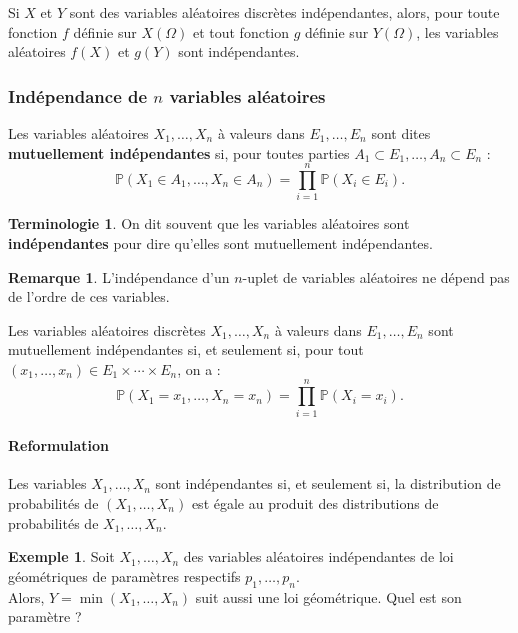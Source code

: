\documentclass[french]{article}
\renewcommand{\P}{\mathbb{P}}
\theoremstyle{plain}
\theoremstyle{definition}
\newtheorem*{ex}{Exemple}
\newtheorem*{rmq}{Remarque}
\newtheorem*{terminologie}{Terminologie}
\theoremstyle{remark}
\begin{document}
\begin{prop}%
	Si $X$ et $Y$ sont des variables aléatoires discrètes indépendantes, alors, pour toute fonction $f$ définie sur $X(\Omega)$ et tout fonction $g$ définie sur $Y(\Omega)$, les variables aléatoires $f(X)$ et $g(Y)$ sont indépendantes.
\end{prop}

\subsubsection*{Indépendance de $n$ variables aléatoires}

\begin{dfn}
	Les variables aléatoires $X_1,\ldots,X_n$ à valeurs dans $E_1,\ldots,E_n$ sont dites \textbf{mutuellement indépendantes} si, pour toutes parties $A_1\subset E_1,\ldots,A_n\subset E_n$ : $$\P(X_1\in A_1,\ldots,X_n\in A_n)=\prod_{i=1}^{n}\P(X_i\in E_i).$$
\end{dfn}

\begin{terminologie}
	On dit souvent que les variables aléatoires sont \textbf{indépendantes} pour dire qu'elles sont mutuellement indépendantes.
\end{terminologie}

\begin{rmq}
	L'indépendance d'un $n$-uplet de variables aléatoires ne dépend pas de l'ordre de ces variables.
\end{rmq}

\begin{prop}%
	Les variables aléatoires discrètes $X_1,\ldots,X_n$ à valeurs dans $E_1,\ldots,E_n$ sont mutuellement indépendantes si, et seulement si, pour tout $(x_1,\ldots,x_n)\in E_1\times\cdots\times E_n$, on a :
	$$\P(X_1=x_1,\ldots,X_n=x_n)=\prod_{i=1}^{n}\P(X_i=x_i).$$
\end{prop}

\paragraph{Reformulation}
Les variables $X_1,\ldots,X_n$ sont indépendantes si, et seulement si, la distribution de probabilités de $(X_1,\ldots,X_n)$ est égale au produit des distributions de probabilités de $X_1,\ldots,X_n$.

\begin{ex}
	Soit $X_1,\ldots,X_n$ des variables aléatoires indépendantes de loi géométriques de paramètres respectifs $p_1,\ldots,p_n$.\\
	Alors, $Y=\min(X_1,\ldots,X_n)$ suit aussi une loi géométrique. Quel est son paramètre ?
\end{ex}
\end{document}
